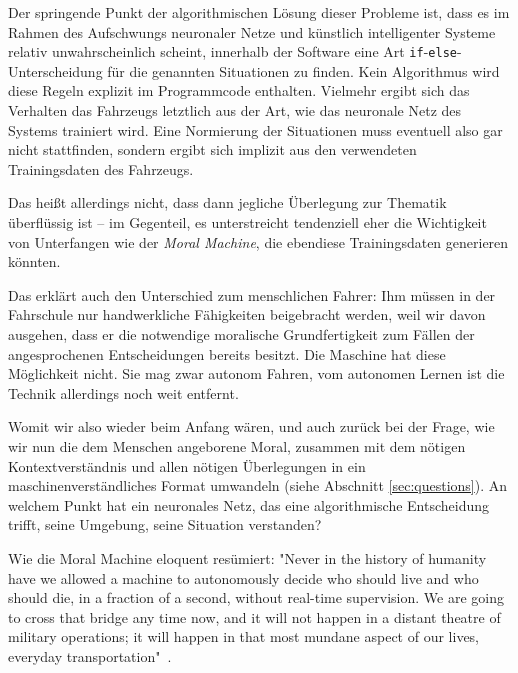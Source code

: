 \documentclass[twocolumn, german]{tum-article}
\begin{document}
Der springende Punkt der algorithmischen Lösung dieser Probleme ist, dass es im Rahmen des Aufschwungs neuronaler Netze und künstlich intelligenter Systeme relativ unwahrscheinlich scheint, innerhalb der Software eine Art \verb!if!-\verb!else!-Unterscheidung für die genannten Situationen zu finden.
Kein Algorithmus wird diese Regeln explizit im Programmcode enthalten.
Vielmehr ergibt sich das Verhalten das Fahrzeugs letztlich aus der Art, wie das neuronale Netz des Systems trainiert wird.
Eine Normierung der Situationen muss eventuell also gar nicht stattfinden, sondern ergibt sich implizit aus den verwendeten Trainingsdaten des Fahrzeugs.

Das heißt allerdings nicht, dass dann jegliche Überlegung zur Thematik überflüssig ist -- im Gegenteil, es unterstreicht tendenziell eher die Wichtigkeit von Unterfangen wie der \emph{Moral Machine}, die ebendiese Trainingsdaten generieren könnten.

Das erklärt auch den Unterschied zum menschlichen Fahrer:
Ihm müssen in der Fahrschule nur handwerkliche Fähigkeiten beigebracht werden, weil wir davon ausgehen, dass er die notwendige moralische Grundfertigkeit zum Fällen der angesprochenen Entscheidungen bereits besitzt.
Die Maschine hat diese Möglichkeit nicht.
Sie mag zwar autonom Fahren, vom autonomen Lernen ist die Technik allerdings noch weit entfernt.

Womit wir also wieder beim Anfang wären, und auch zurück bei der Frage, wie wir nun die dem Menschen angeborene Moral, zusammen mit dem nötigen Kontextverständnis und allen nötigen Überlegungen in ein maschinenverständliches Format umwandeln (siehe Abschnitt \ref{sec:questions}).
An welchem Punkt hat ein neuronales Netz, das eine algorithmische Entscheidung trifft, seine Umgebung, seine Situation verstanden?

Wie die Moral Machine eloquent resümiert: "Never in the history of humanity have we allowed a machine to autonomously decide who should live and who should die, in a fraction of a second, without real-time supervision. We are going to cross that bridge any time now, and it will not happen in a distant theatre of military operations; it will happen in that most mundane aspect of our lives, everyday transportation"~\cite[S. 63]{moral-machine}.

\clearpage
\printbibliography
\end{document}
